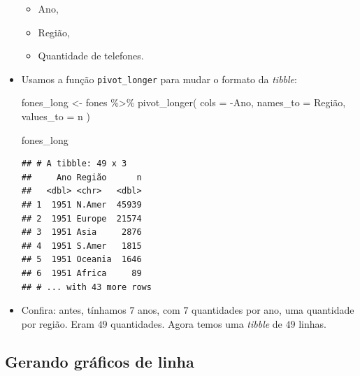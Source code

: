 \documentclass[
  11pt]{report}
\newenvironment{Shaded}{\begin{snugshade}}{\end{snugshade}}
\newcommand{\AttributeTok}[1]{\textcolor[rgb]{0.77,0.63,0.00}{#1}}
\newcommand{\FunctionTok}[1]{\textcolor[rgb]{0.00,0.00,0.00}{#1}}
\newcommand{\NormalTok}[1]{#1}
\newcommand{\OtherTok}[1]{\textcolor[rgb]{0.56,0.35,0.01}{#1}}
\newcommand{\SpecialCharTok}[1]{\textcolor[rgb]{0.00,0.00,0.00}{#1}}
\newcommand{\StringTok}[1]{\textcolor[rgb]{0.31,0.60,0.02}{#1}}
\renewenvironment{Shaded}{
    \begin{mdframed}[%
      roundcorner=2pt,%
      innerleftmargin=5pt,%
      innerrightmargin=5pt,%
      topline=true,%
      leftline=true,%
      rightline=true,%
      bottomline=true,%
      linewidth=0.5pt,%
      linecolor=black!20,%
      backgroundcolor=black!2,%
      skipabove=2ex,%
      skipbelow=2.5ex%
    ]%
  }
  {
    \end{mdframed}
  }
\begin{document}
\begin{itemize}
  \begin{itemize}
  \item
    Ano,
  \item
    Região,
  \item
    Quantidade de telefones.
  \end{itemize}
\item
  Usamos a função \texttt{pivot\_longer} para mudar o formato da \emph{tibble}:

\begin{Shaded}
\begin{Highlighting}[]
\NormalTok{fones\_long }\OtherTok{\textless{}{-}}\NormalTok{ fones }\SpecialCharTok{\%\textgreater{}\%} 
  \FunctionTok{pivot\_longer}\NormalTok{(}
    \AttributeTok{cols =} \SpecialCharTok{{-}}\NormalTok{Ano,}
    \AttributeTok{names\_to =} \StringTok{\textquotesingle{}Região\textquotesingle{}}\NormalTok{,}
    \AttributeTok{values\_to =} \StringTok{\textquotesingle{}n\textquotesingle{}}
\NormalTok{  )}

\NormalTok{fones\_long}
\end{Highlighting}
\end{Shaded}

\begin{verbatim}
## # A tibble: 49 x 3
##     Ano Região      n
##   <dbl> <chr>   <dbl>
## 1  1951 N.Amer  45939
## 2  1951 Europe  21574
## 3  1951 Asia     2876
## 4  1951 S.Amer   1815
## 5  1951 Oceania  1646
## 6  1951 Africa     89
## # ... with 43 more rows
\end{verbatim}
\item
  Confira: antes, tínhamos $7$ anos, com $7$ quantidades por ano, uma quantidade por região. Eram $49$ quantidades. Agora temos uma \emph{tibble} de $49$ linhas.
\end{itemize}

\hypertarget{gerando-gruxe1ficos-de-linha}{%
\subsection{Gerando gráficos de linha}\label{gerando-gruxe1ficos-de-linha}}
\end{document}
